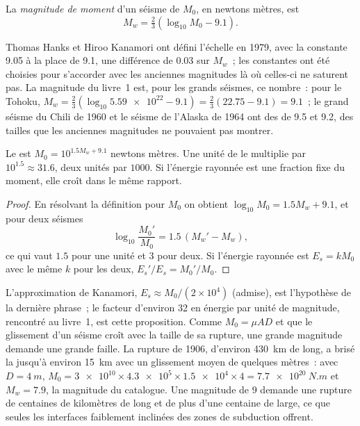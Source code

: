 \begin{definition}\label{def:b1:earthquake-source:mw}
La \emph{magnitude de moment} d'un séisme de
 $M_0$, en newtons mètres, est
\[
  M_w = \tfrac23\left(\log_{10} M_0 - 9.1\right) .
\]
\end{definition}

Thomas Hanks et Hiroo Kanamori ont défini l'échelle en 1979, avec la constante
9.05 à la place de 9.1, une différence de 0.03 sur $M_w$~; les constantes ont été choisies
pour s'accorder avec les anciennes magnitudes là où celles-ci ne saturent pas. La magnitude du
livre~1 est, pour les grands séismes, ce nombre~: pour le Tohoku,
$M_w = \tfrac23(\log_{10}\num{5.59e22} - 9.1) = \tfrac23(22.75 - 9.1) = 9.1$~;
le grand séisme du Chili de 1960 et le séisme de l'Alaska de 1964 ont des
 de 9.5 et 9.2, des tailles que les anciennes magnitudes ne pouvaient pas
montrer.

\begin{proposition}\label{prop:b1:earthquake-source:moment-steps}
Le  est $M_0 = 10^{1.5 M_w + 9.1}$ newtons mètres. Une unité de
 le multiplie par $10^{1.5} \approx 31.6$, deux unités par
$1000$. Si l'énergie rayonnée est une fraction fixe du moment, elle croît dans
le même rapport.
\end{proposition}

\begin{proof}
En résolvant la définition pour $M_0$ on obtient $\log_{10} M_0 = 1.5 M_w + 9.1$,
et pour deux séismes
\[
  \log_{10}\frac{M_0'}{M_0} = 1.5\,(M_w' - M_w) ,
\]
ce qui vaut $1.5$ pour une unité et $3$ pour deux. Si l'énergie rayonnée est $E_s = k M_0$ avec le même $k$
pour les deux, $E_s'/E_s = M_0'/M_0$.
\end{proof}

L'approximation de Kanamori, $E_s \approx M_0/(2\times10^4)$ (admise), est
l'hypothèse de la dernière phrase~; le facteur d'environ 32 en énergie par unité de
magnitude, rencontré au livre~1, est cette proposition. Comme $M_0 = \mu A D$ et que le
glissement d'un séisme croît avec la taille de sa rupture, une grande magnitude
demande une grande faille. La rupture de 1906, d'environ \qty{430}{km} de long, a brisé la
 jusqu'à environ \qty{15}{km} avec un glissement moyen de quelques mètres~:
avec $D = \qty{4}{m}$, $M_0 = \num{3e10}\times\num{4.3e5}\times\num{1.5e4}
\times 4 = \qty{7.7e20}{N.m}$ et $M_w = 7.9$, la magnitude du catalogue.
Une magnitude de 9 demande une rupture de centaines de kilomètres de long et de
plus d'une centaine de large, ce que seules les interfaces faiblement inclinées des
zones de subduction offrent.

